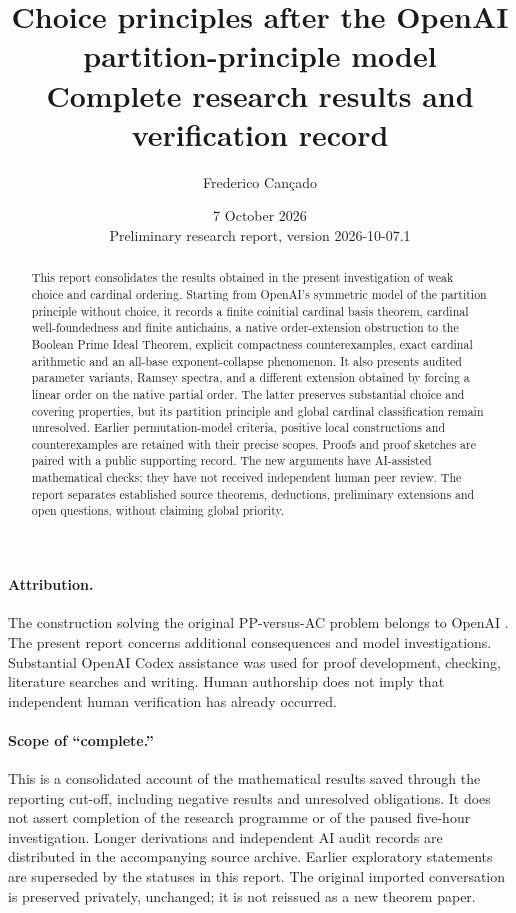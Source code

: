 \documentclass[11pt,a4paper]{article}
\title{\textbf{Choice principles after the OpenAI\protect\\ partition-principle model}\protect\\[9pt]\large Complete research results and verification record}
\author{Frederico Can\c{c}ado}
\date{7 October 2026\protect\\\small Preliminary research report, version 2026-10-07.1}
\theoremstyle{definition}\newtheorem{definition}[theorem]{Definition}
\theoremstyle{remark}\newtheorem{remark}[theorem]{Remark}
\begin{document}
\maketitle
\begin{abstract}
This report consolidates the results obtained in the present investigation of weak choice and cardinal ordering. Starting from OpenAI's symmetric model of the partition principle without choice, it records a finite coinitial cardinal basis theorem, cardinal well-foundedness and finite antichains, a native order-extension obstruction to the Boolean Prime Ideal Theorem, explicit compactness counterexamples, exact cardinal arithmetic and an all-base exponent-collapse phenomenon. It also presents audited parameter variants, Ramsey spectra, and a different extension obtained by forcing a linear order on the native partial order. The latter preserves substantial choice and covering properties, but its partition principle and global cardinal classification remain unresolved. Earlier permutation-model criteria, positive local constructions and counterexamples are retained with their precise scopes. Proofs and proof sketches are paired with a public supporting record. The new arguments have AI-assisted mathematical checks; they have not received independent human peer review. The report separates established source theorems, deductions, preliminary extensions and open questions, without claiming global priority.
\end{abstract}
\paragraph{Attribution.} The construction solving the original PP-versus-AC problem belongs to OpenAI \cite{OpenAI}. The present report concerns additional consequences and model investigations. Substantial OpenAI Codex assistance was used for proof development, checking, literature searches and writing. Human authorship does not imply that independent human verification has already occurred.
\paragraph{Scope of ``complete.''} This is a consolidated account of the mathematical results saved through the reporting cut-off, including negative results and unresolved obligations. It does not assert completion of the research programme or of the paused five-hour investigation. Longer derivations and independent AI audit records are distributed in the accompanying source archive. Earlier exploratory statements are superseded by the statuses in this report. The original imported conversation is preserved privately, unchanged; it is not reissued as a new theorem paper.
\clearpage\tableofcontents\clearpage


\clearpage
\clearpage
{}
\clearpage
{}
\clearpage
\end{document}
